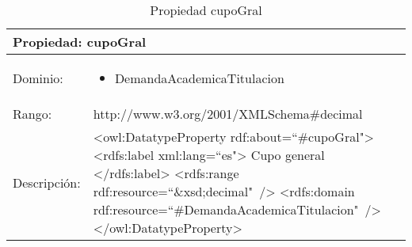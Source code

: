 \begin{table}[!ht]
	\centering
	\begin{tabular}{|p{}|p{}|}
		\hline
		\multicolumn{2}{|l|}{Propiedad: \textbf{cupoGral}}
		\\ \hline
		Dominio:&
		\begin{itemize}
			\item DemandaAcademicaTitulacion
		\end{itemize}
		\\ \hline
		Rango:&
		http://www.w3.org/2001/XMLSchema\#decimal
		\\ \hline
		Descripción:&
		\textless owl:DatatypeProperty rdf:about=``\#cupoGral"\textgreater\newline 
		\tab\textless rdfs:label xml:lang=``es"\textgreater\newline
		\tab\tab Cupo general\newline
		\tab\textless /rdfs:label\textgreater\newline
		\tab\textless rdfs:range\newline
		\tab\tab rdf:resource=``\&xsd;decimal"\ /\textgreater\newline
		\tab\textless rdfs:domain\newline
		\tab\tab rdf:resource=``\#DemandaAcademicaTitulacion"\ /\textgreater\newline
		\textless /owl:DatatypeProperty\textgreater
		\\ \hline
	\end{tabular}
	\caption{Propiedad cupoGral}
	\label{propiedad-cupogral}
\end{table}

